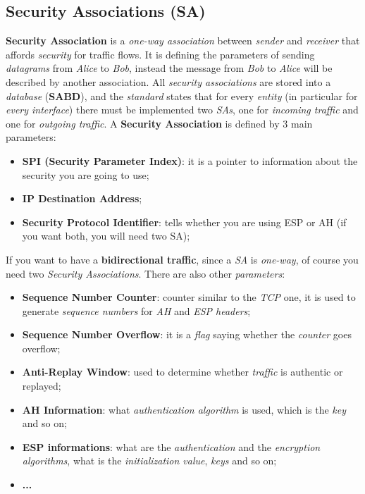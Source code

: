 \documentclass{article}
\begin{document}
\subsection{Security Associations (SA)}
\textbf{Security Association} is a \emph{one-way association} between \emph{sender} and \emph{receiver} that affords \emph{security} for traffic flows.  It is defining the parameters of sending \emph{datagrams} from \emph{Alice} to \emph{Bob}, instead the message from \emph{Bob} to \emph{Alice} will be described by another association. All \emph{security associations} are stored into a \emph{database} (\textbf{SABD}), and the \emph{standard} states that for every \emph{entity} (in particular for \emph{every interface}) there must be implemented two \emph{SAs}, one for \emph{incoming traffic} and one for \emph{outgoing traffic}. A \textbf{Security Association} is defined by 3 main parameters:
\begin{itemize}
\item \textbf{SPI (Security Parameter Index)}: it is a pointer to information about the security you are going to use;
\item \textbf{IP Destination Address};
\item \textbf{Security Protocol Identifier}: tells whether you are using ESP or AH (if you want both, you will need two SA);
\end{itemize}
If you want to have a \textbf{bidirectional traffic}, since a \emph{SA} is \emph{one-way}, of course you need two \emph{Security Associations}. There are also other \emph{parameters}:
\begin{itemize}
\item \textbf{Sequence Number Counter}: counter similar to the \emph{TCP} one, it is used to generate \emph{sequence numbers} for \emph{AH} and \emph{ESP headers};
\item \textbf{Sequence Number Overflow}: it is a \emph{flag} saying whether the \emph{counter} goes overflow;
\item \textbf{Anti-Replay Window}: used to determine whether \emph{traffic} is authentic or replayed;
\item \textbf{AH Information}: what \emph{authentication algorithm} is used, which is the \emph{key} and so on;
\item \textbf{ESP informations}: what are the \emph{authentication} and the \emph{encryption algorithms}, what is the \emph{initialization value}, \emph{keys} and so on;
\item \textbf{...}
\end{itemize}
\end{document}
